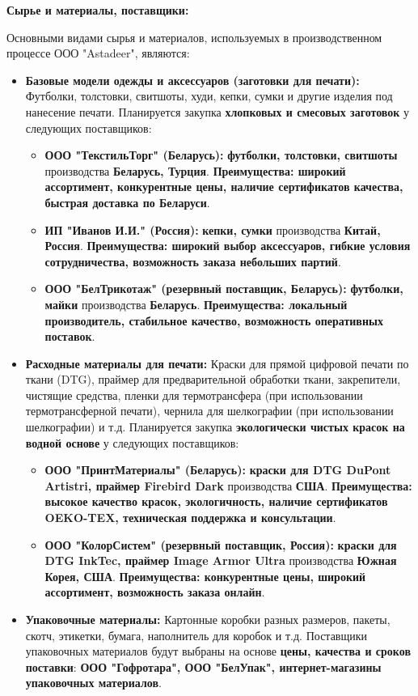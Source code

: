\vspace{0.3cm}

\textbf{Сырье и материалы, поставщики:}

Основными видами сырья и материалов, используемых в производственном процессе ООО "Astadeer", являются:

\begin{itemize}
    \item \textbf{Базовые модели одежды и аксессуаров (заготовки для печати):}  Футболки, толстовки, свитшоты, худи, кепки, сумки и другие изделия под нанесение печати.  Планируется закупка \textbf{хлопковых и смесовых заготовок}  у следующих поставщиков:
        \begin{itemize}
            \item \textbf{ООО "ТекстильТорг" (Беларусь):} \textbf{футболки, толстовки, свитшоты} производства \textbf{Беларусь, Турция}. \textbf{Преимущества: широкий ассортимент, конкурентные цены, наличие сертификатов качества, быстрая доставка по Беларуси}.
            \item \textbf{ИП "Иванов И.И." (Россия):} \textbf{кепки, сумки} производства \textbf{Китай, Россия}. \textbf{Преимущества:  широкий выбор аксессуаров,  гибкие условия сотрудничества,  возможность заказа небольших партий}.
            \item \textbf{ООО "БелТрикотаж" (резервный поставщик, Беларусь):} \textbf{футболки, майки} производства \textbf{Беларусь}. \textbf{Преимущества:  локальный производитель,  стабильное качество,  возможность оперативных поставок}.
        \end{itemize}
    \item \textbf{Расходные материалы для печати:}  Краски для прямой цифровой печати по ткани (DTG), праймер для предварительной обработки ткани, закрепители, чистящие средства, пленки для термотрансфера (при использовании термотрансферной печати), чернила для шелкографии (при использовании шелкографии) и т.д.  Планируется закупка \textbf{экологически чистых красок на водной основе} у следующих поставщиков:
        \begin{itemize}
            \item \textbf{ООО "ПринтМатериалы" (Беларусь):}  \textbf{краски для DTG DuPont Artistri, праймер Firebird Dark} производства \textbf{США}. \textbf{Преимущества:  высокое качество красок,  экологичность,  наличие сертификатов OEKO-TEX,  техническая поддержка и консультации}.
            \item \textbf{ООО "КолорСистем" (резервный поставщик, Россия):}  \textbf{краски для DTG InkTec, праймер Image Armor Ultra} производства \textbf{Южная Корея, США}. \textbf{Преимущества:  конкурентные цены,  широкий ассортимент,  возможность заказа онлайн}.
        \end{itemize}
    \item \textbf{Упаковочные материалы:}  Картонные коробки разных размеров, пакеты, скотч, этикетки, бумага, наполнитель для коробок и т.д.  Поставщики упаковочных материалов будут выбраны на основе \textbf{цены, качества и сроков поставки}: \textbf{ООО "Гофротара", ООО "БелУпак", интернет-магазины упаковочных материалов}.
\end{itemize}


